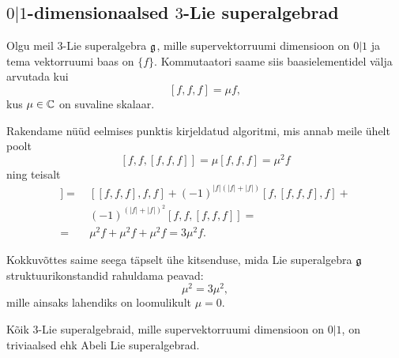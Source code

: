
\subsection{\texorpdfstring{$0|1$}{0|1}-dimensionaalsed
    \texorpdfstring{$3$}{3}-Lie superalgebrad}

Olgu meil $3$-Lie superalgebra $\mathfrak{g}$, mille supervektorruumi dimensioon
on $0|1$ ja tema vektorruumi baas on $\{ f \}$. Kommutaatori saame
siis baasielementidel välja arvutada kui
\[ [f, f, f] = \mu f, \]
kus $\mu \in \mathbb{C}$ on suvaline skalaar.

Rakendame nüüd eelmises punktis kirjeldatud algoritmi, mis annab meile
ühelt poolt 
\[
    [f, f, [f, f, f]] = \mu [f, f, f] = \mu^2 f
\]
ning teisalt
\begin{align*}
    [f, f, [f, f, f]] =&\
        [[f, f, f], f, f] +
        (-1)^{|f|(|f| + |f|)} [f, [f, f, f], f] + \\
        &\ (-1)^{(|f| + |f|)^2} [f, f, [f, f, f]] = \\
    =&\ \mu^2 f +  \mu^2 f +  \mu^2 f = 3\mu^2 f.
\end{align*}

Kokkuvõttes saime seega täpselt ühe kitsenduse, mida Lie superalgebra $\mathfrak{g}$
struktuurikonstandid rahuldama peavad:
\[ \mu^2 = 3\mu^2, \]
mille ainsaks lahendiks on loomulikult $\mu = 0$.

\begin{thm}
    Kõik $3$-Lie superalgebraid, mille supervektorruumi dimensioon on $0|1$,
    on triviaalsed ehk Abeli Lie superalgebrad.
\end{thm}
